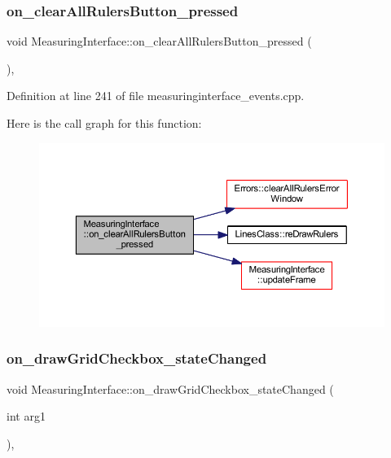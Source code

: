 \subsubsection{\texorpdfstring{on\_clearAllRulersButton\_pressed}{on\_clearAllRulersButton\_pressed}}
{\footnotesize\ttfamily void Measuring\+Interface\+::on\+\_\+clear\+All\+Rulers\+Button\+\_\+pressed (\begin{DoxyParamCaption}{ }\end{DoxyParamCaption})\hspace{0.3cm}{\ttfamily [private]}, {\ttfamily [slot]}}



Definition at line 241 of file measuringinterface\+\_\+events.\+cpp.

Here is the call graph for this function\+:
\nopagebreak
\begin{figure}[H]
\begin{center}
\leavevmode
\includegraphics[width=350pt]{class_measuring_interface_a423a52e80d530b4cf1154422b3de5073_cgraph}
\end{center}
\end{figure}
\mbox{\label{class_measuring_interface_a37da2b051cdaef7769ac1f1f8a849753}} 
\subsubsection{\texorpdfstring{on\_drawGridCheckbox\_stateChanged}{on\_drawGridCheckbox\_stateChanged}}
{\footnotesize\ttfamily void Measuring\+Interface\+::on\+\_\+draw\+Grid\+Checkbox\+\_\+state\+Changed (\begin{DoxyParamCaption}\item[{int}]{arg1 }\end{DoxyParamCaption})\hspace{0.3cm}{\ttfamily [private]}, {\ttfamily [slot]}}



